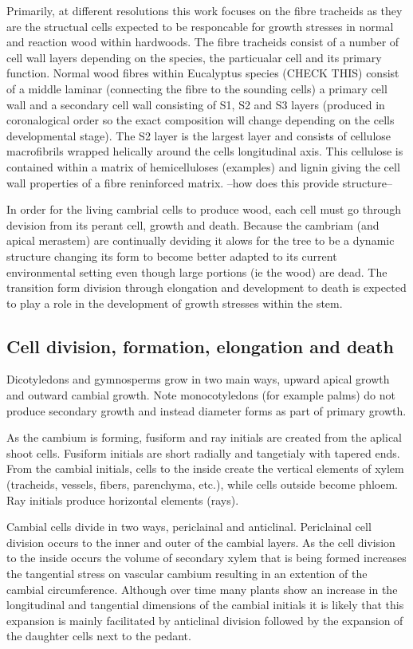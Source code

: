 \documentclass{article}
\begin{document}
Primarily, at different resolutions this work focuses on the fibre tracheids as
they are the structual cells expected to be responcable for growth stresses in
normal and reaction wood within hardwoods. The fibre tracheids consist of a
number of cell wall layers depending on the species, the particualar cell and
its primary function. Normal wood fibres within Eucalyptus species (CHECK THIS)
consist of a middle laminar (connecting the fibre to the sounding cells) a
primary cell wall and a secondary cell wall consisting of S1, S2 and S3 layers
(produced in coronalogical order so the exact composition will change depending
on the cells developmental stage). The S2 layer is the largest layer and
consists of cellulose macrofibrils wrapped helically around the cells
longitudinal axis. This cellulose is contained within a matrix of hemicelluloses (examples)
and lignin giving the cell wall properties of a fibre reninforced matrix. --how
does this provide structure--

In order for the living cambrial cells to produce wood, each cell must go
through devision from its perant cell, growth and death. Because the
cambriam (and apical merastem) are continually deviding it alows for the tree to be a dynamic
structure changing its form to become better adapted to its current environmental
setting even though large portions (ie the wood) are dead. The transition form
division through elongation and development to death is expected to play a role
in the development of growth stresses within the stem.

\subsection{Cell division, formation, elongation and death}
Dicotyledons and gymnosperms grow in two main ways, upward apical growth and
outward cambial growth. Note monocotyledons (for example palms) do not produce
secondary growth and instead diameter forms as part of primary growth.

As the cambium is forming, fusiform and ray initials are created from the
aplical shoot cells. Fusiform initials are short radially and tangetialy with
tapered ends. From the cambial initials, cells to the inside create the vertical
elements of xylem (tracheids, vessels, fibers, parenchyma, etc.), while cells outside become phloem.
Ray initials produce horizontal elements (rays).

Cambial cells divide in two ways, periclainal and anticlinal.
Periclainal cell division occurs to the inner and outer of the cambial layers.
As the cell division to the inside occurs the volume of secondary xylem that is being
formed increases the tangential stress on vascular cambium resulting in an
extention of the cambial circumference. Although over time many plants show an
increase in the longitudinal and tangential dimensions of the cambial initials it is
likely that this expansion is mainly facilitated by anticlinal division followed
by the expansion of the daughter cells next to the pedant.
\end{document}
